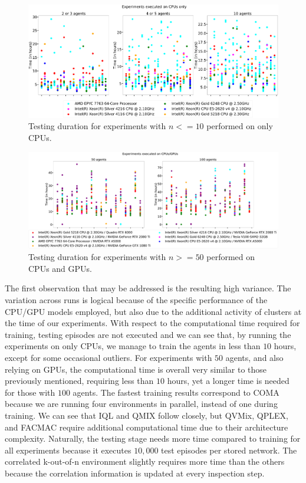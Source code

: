 \begin{figure}
    \centering
    \includegraphics[width=\textwidth]{tex_thesis/figures/ch5/testing_time_cpu.pdf}
    \caption{Testing duration for experiments with $n<=10$ performed on only CPUs.}
    \label{fig:testing_time_cpu}
\end{figure}

\begin{figure}
    \centering
    \includegraphics[width=\textwidth]{tex_thesis/figures/ch5/testing_time_gpu.pdf}
    \caption{Testing duration for experiments with $n>=50$ performed on CPUs and GPUs.}
    \label{fig:testing_time_gpu}
\end{figure}

The first observation that may be addressed is the resulting high variance. 
The variation across runs is logical because of the specific performance of the CPU/GPU models employed, but also due to the additional activity of clusters at the time of our experiments.
With respect to the computational time required for training, testing episodes are not executed and we can see that, by running the experiments on only CPUs, we manage to train the agents in less than $10$ hours, except for some occasional outliers.
For experiments with $50$ agents, and also relying on GPUs, the computational time is overall very similar to those previously mentioned, requiring less than $10$ hours, yet a longer time is needed for those with $100$ agents.
The fastest training results correspond to COMA because we are running four environments in parallel, instead of one during training.
We can see that IQL and QMIX follow closely, but QVMix, QPLEX, and FACMAC require additional computational time due to their architecture complexity.
Naturally, the testing stage needs more time compared to training for all experiments because it executes $10,000$ test episodes per stored network.
The correlated k-out-of-n environment slightly requires more time than the others because the correlation information is updated at every inspection step.


